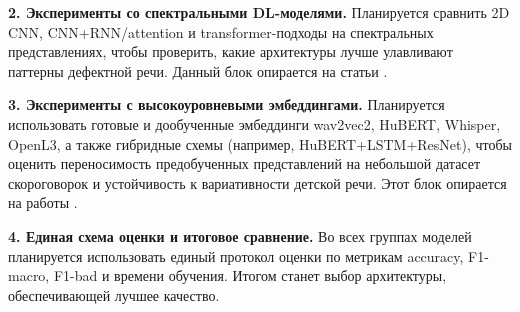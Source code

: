 \documentclass[a4paper,14pt]{extarticle}
\begin{document}
\textbf{2. Эксперименты со спектральными DL-моделями.}
Планируется сравнить 2D CNN, CNN+RNN/attention и transformer-подходы на спектральных представлениях, чтобы проверить, какие архитектуры лучше улавливают паттерны дефектной речи. Данный блок опирается на статьи
\cite{hershey2017_cnn_audio,kuo2022_chinese_ssd,voice_disorders_deeplearning_2025,kourkounakis2021_fluentnet,kaushik2021_slinet,liu2021_swin_transformer,kim2024_ssd_age_bias}.

\textbf{3. Эксперименты с высокоуровневыми эмбеддингами.}
Планируется использовать готовые и дообученные эмбеддинги wav2vec2, HuBERT, Whisper, OpenL3, а также гибридные схемы (например, HuBERT+LSTM+ResNet), чтобы оценить переносимость предобученных представлений на небольшой датасет скороговорок и устойчивость к вариативности
детской речи. Этот блок опирается на работы
\cite{baevski2020_wav2vec2,hsu2021_hubert,cramer2019_openl3,qi2021_fhvae_disorder,jain2023_whisper_child_speech,usefulness_asr_ssd_2025,asr_screening_children_2024,huang2024_hybrid_module_transformer,raghu2025_multilingual_dysarthria}.

\textbf{4. Единая схема оценки и итоговое сравнение.}
Во всех группах моделей планируется использовать единый протокол оценки по метрикам accuracy, F1-macro, F1-bad и времени обучения.
Итогом станет выбор архитектуры, обеспечивающей лучшее качество.
	
\newpage 
\printbibliography[heading=bibintoc] 

\newpage
\appendix
\end{document}

